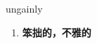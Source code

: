 
\begin{frame}
{\huge ungainly}
\begin{center}
\begin{enumerate}\Large
  \item \textbf{笨拙的，不雅的}
\end{enumerate}
\end{center}
\end{frame}
